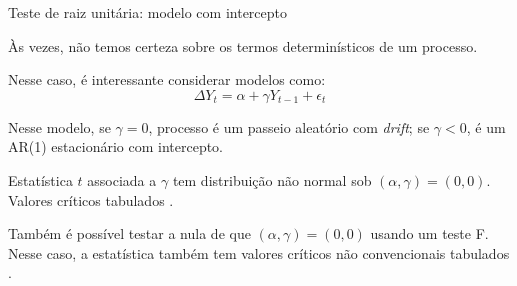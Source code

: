 \documentclass[11pt]{beamer}
\newenvironment{wideitemize}{\itemize\addtolength{\itemsep}{10pt}}{\enditemize}
\newenvironment{halfwideitemize}{\itemize\addtolength{\itemsep}{0.5em}}{\enditemize}
\begin{document}
\begin{frame}{Teste de raiz unitária: modelo com intercepto}
	\begin{wideitemize}
		\item Às vezes, não temos certeza sobre os termos determinísticos de um processo.
		\item Nesse caso, é interessante considerar modelos como:
		\begin{equation}
			\label{eq_drift}
			\Delta Y_t = \alpha + \gamma Y_{t-1} + \epsilon_t
		\end{equation}
		\begin{halfwideitemize}
			\item Nesse modelo, se $\gamma = 0$, processo é um passeio aleatório com \textit{drift}; se $\gamma < 0$, é um AR(1) estacionário com intercepto.
			\item Estatística $t$ associada a $\gamma$ tem distribuição não normal sob $(\alpha, \gamma) = (0,0)$. Valores críticos tabulados \citep{Dickey1981}.
			\item Também é possível testar a nula de que $(\alpha,\gamma) =(0,0)$ usando um teste F. Nesse caso, a estatística também tem valores críticos não convencionais tabulados \citep{Dickey1981}.
		\end{halfwideitemize}
	\end{wideitemize}
\end{frame}
\end{document}
